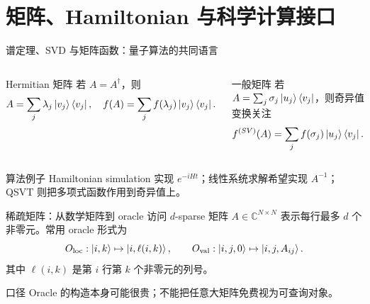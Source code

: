 \documentclass[aspectratio=169,10pt]{ctexbeamer}
\begin{document}
\section{矩阵、Hamiltonian 与科学计算接口}

\begin{frame}{谱定理、SVD 与矩阵函数：量子算法的共同语言}
\begin{columns}[T,totalwidth=\textwidth]
\begin{keybox}{Hermitian 矩阵}
若 $A=A^{\dagger}$，则
\[
A=\sum_j \lambda_j\ket{v_j}\bra{v_j},
\quad f(A)=\sum_j f(\lambda_j)\ket{v_j}\bra{v_j}.
\]
\end{keybox}
\begin{keybox}{一般矩阵}
若 $A=\sum_j \sigma_j\ket{u_j}\bra{v_j}$，则奇异值变换关注
\[
f^{(SV)}(A)=\sum_j f(\sigma_j)\ket{u_j}\bra{v_j}.
\]
\end{keybox}
\end{columns}
\vspace{2mm}
\begin{exbox}{算法例子}
Hamiltonian simulation 实现 $e^{-iHt}$；线性系统求解希望实现 $A^{-1}$；QSVT 则把多项式函数作用到奇异值上。
\end{exbox}
\end{frame}


\begin{frame}{稀疏矩阵：从数学矩阵到 oracle 访问}
\small
$d$-sparse 矩阵 $A\in\mathbb C^{N\times N}$ 表示每行最多 $d$ 个非零元。常用 oracle 形式为
\[
O_{\rm loc}:\ket{i,k}\mapsto\ket{i,\ell(i,k)},
\qquad
O_{\rm val}:\ket{i,j,0}\mapsto\ket{i,j,A_{ij}}.
\]
其中 $\ell(i,k)$ 是第 $i$ 行第 $k$ 个非零元的列号。
\begin{center}
\end{center}
\begin{warnbox}{口径}
Oracle 的构造本身可能很贵；不能把任意大矩阵免费视为可查询对象。
\end{warnbox}
\end{frame}
\end{document}
